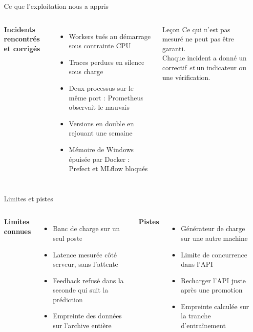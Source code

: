 \documentclass[aspectratio=169,11pt]{beamer}
\begin{document}
\begin{frame}{Ce que l'exploitation nous a appris}
\begin{columns}[T]
\textbf{Incidents rencontrés et corrigés}
\begin{itemize}
  \item Workers tués au démarrage sous contrainte CPU
  \item Traces perdues en silence sous charge
  \item Deux processus sur le même port : Prometheus observait le mauvais
  \item Versions en double en rejouant une semaine
  \item Mémoire de Windows épuisée par Docker : Prefect et MLflow bloqués
\end{itemize}
\begin{block}{Leçon}
Ce qui n'est pas mesuré ne peut pas être garanti.\\[3pt]
Chaque incident a donné un correctif \emph{et} un indicateur ou une vérification.
\end{block}
\end{columns}
\end{frame}

\begin{frame}{Limites et pistes}
\begin{columns}[T]
\textbf{Limites connues}
\begin{itemize}
  \item Banc de charge sur un seul poste
  \item Latence mesurée côté serveur, sans l'attente
  \item Feedback refusé dans la seconde qui suit la prédiction
  \item Empreinte des données sur l'archive entière
\end{itemize}
\textbf{Pistes}
\begin{itemize}
  \item Générateur de charge sur une autre machine
  \item Limite de concurrence dans l'API
  \item Recharger l'API juste après une promotion
  \item Empreinte calculée sur la tranche d'entraînement
\end{itemize}
\end{columns}
\end{frame}
\end{document}
